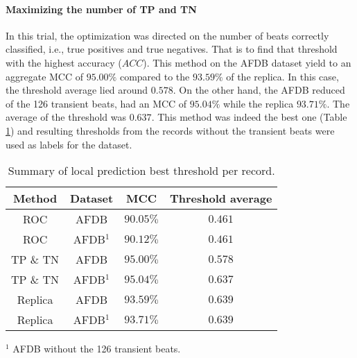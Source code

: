 \paragraph{Maximizing the number of TP and TN}
\label{sec:max_accuracy}
In this trial, the optimization was directed on the number of beats correctly classified, i.e., true positives and true negatives. That is to find that threshold with the highest accuracy ($ACC$). This method on the AFDB dataset yield to an aggregate MCC of $95.00\%$ compared to the $93.59\%$ of the replica. In this case, the threshold average lied around $0.578$. On the other hand, the AFDB reduced of the 126 transient beats, had an MCC of $95.04\%$ while the replica $93.71\%$. The average of the threshold was $0.637$. This method was indeed the best one (Table \ref{table:local_threshold_summary}) and resulting thresholds from the records without the transient beats were used as labels for the dataset.
\begin{table}[h]
\begin{center}
\begin{threeparttable}
\caption{Summary of local prediction best threshold per record.}
\label{table:local_threshold_summary}
\scriptsize
  \begin{tabular}{c c c c}
  \toprule
  \textbf{Method} & \textbf{Dataset} & \textbf{MCC} & \textbf{Threshold average} \\
  \midrule  
  ROC & AFDB & $90.05\%$ & $0.461$\\
  ROC & AFDB$^1$ & $90.12\%$ & $0.461$\\
  \hline
  TP \& TN & AFDB & $95.00\%$ & $0.578$\\
  TP \& TN & AFDB$^1$ & $95.04\%$ & $0.637$\\
  \hline
  Replica & AFDB & $93.59\%$ & $0.639$\\
  Replica & AFDB$^1$ & $93.71\%$ & $0.639$\\
  \bottomrule
\end{tabular}
\begin{tablenotes}
	\item $^1$ AFDB without the 126 transient beats.
    \end{tablenotes}
\end{threeparttable}
\end{center}
\end{table}

